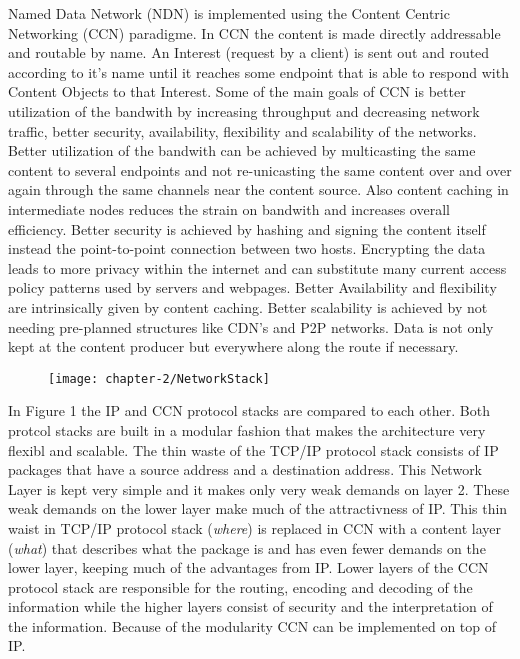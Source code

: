 Named Data Network (NDN) is implemented using the Content Centric Networking (CCN) paradigme. In CCN the content is made directly addressable and routable by name. An Interest (request by a client) is sent out and routed according to it's name until it reaches some endpoint that is able to respond with Content Objects to that Interest. Some of the main goals of CCN is better utilization of the bandwith by increasing throughput and decreasing network traffic, better security, availability, flexibility and scalability of the networks. Better utilization of the bandwith can be achieved by multicasting the same content to several endpoints and not re-unicasting the same content over and over again through the same channels near the content source. Also content caching in intermediate nodes reduces the strain on bandwith and increases overall efficiency. Better security is achieved by hashing and signing the content itself instead the point-to-point connection between two hosts. Encrypting the data leads to more privacy within the internet and can substitute many current access policy patterns used by servers and webpages. Better Availability and flexibility are intrinsically given by content caching. Better scalability is achieved by not needing pre-planned structures like CDN's and P2P networks. Data is not only kept at the content producer but everywhere along the route if necessary.

\begin{figure}[h]
\texttt{[image: chapter-2/NetworkStack]}
\centering
\end{figure}

In Figure 1 the IP and CCN protocol stacks are compared to each other. Both protcol stacks are built in a modular fashion that makes the architecture very flexibl and scalable. The thin waste of the TCP/IP protocol stack consists of IP packages that have a source address and a destination address. This Network Layer is kept very simple and it makes only very weak demands on layer 2. These weak demands on the lower layer make much of the attractivness of IP. This thin waist in TCP/IP protocol stack (\emph{where}) is replaced in CCN with a content layer (\emph{what}) that describes what the package is and has even fewer demands on the lower layer, keeping much of the advantages from IP. Lower layers of the CCN protocol stack are responsible for the routing, encoding and decoding of the information while the higher layers consist of security and the interpretation of the information. Because of the modularity CCN can be implemented on top of IP.

